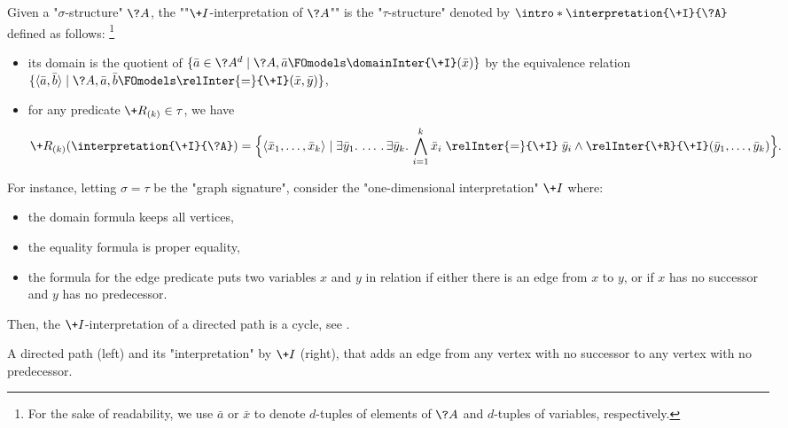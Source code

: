 Given a "$\sigma$-structure" $\?A$, the \AP""$\+I$-interpretation of $\?A$"" is the "$\tau$-structure" denoted by \AP$\intro*\interpretation{\+I}{\?A}$ defined as follows:%
\footnote{For the sake of readability, we use $\bar a$ or $\bar x$ to
denote $d$-tuples of elements of $\?A$ and $d$-tuples of variables, respectively.}
\begin{itemize}
	\item its domain is the quotient of 
		$\{\bar a \in \?A^d \mid \?A, \bar a \FOmodels \domainInter{\+I}(\bar x)\}$
		by the equivalence relation
		$\set{\tup{\bar a, \bar b} \mid \?A, \bar a, \bar b \FOmodels \relInter{=}{\+I}(\bar x, \bar y)}$,
	\item for any predicate $\+R_{(k)} \in \tau$,
		we have
		\[
			\+R_{(k)}(\interpretation{\+I}{\?A}) =
			\Big\{\tup{\bar x_1, \dotsc, \bar x_k} \mid
				\exists \bar y_1.\, \dotsc.\, \exists \bar y_k.\,
				\bigwedge_{i=1}^k \bar x_i \mathrel{\relInter{=}{\+I}} \bar y_i
				\land \relInter{\+R}{\+I}(\bar y_1, \dotsc, \bar y_k)
			\Big\}.
		\]
\end{itemize}
For instance, letting $\sigma =\tau$ be the "graph signature", consider
the "one-dimensional interpretation" $\+I$ where:
\begin{itemize}
	\item the domain formula keeps all vertices,
	\item the equality formula is proper equality,
	\item the formula for the edge predicate puts two variables $x$ and $y$ in relation
		if either there is an edge from $x$ to $y$, or if $x$ has no successor and $y$ has no predecessor.
\end{itemize}
Then, the $\+I$-interpretation of a directed path is a cycle,
see .
\begin{marginfigure}
	\centering
	\qquad
	\caption{
		\AP\label{fig:interpretation-path-into-cycle}
		A directed path (left) and its "interpretation" by $\+I$ (right),
		that adds an edge from any vertex with no successor to any vertex with no predecessor.
	}
\end{marginfigure}

